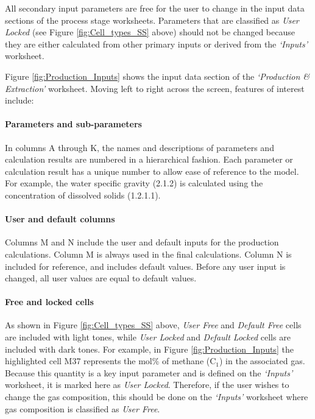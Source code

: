 \documentclass[11pt]{report}
\newcommand{\sheet}[1]{\textit{`{#1}'}}
\begin{document}
All secondary input parameters are free for the user to change in the input data sections of the process stage worksheets. Parameters that are classified as \emph{User Locked} (see Figure \ref{fig:Cell_types_SS} above) should not be changed because they are either calculated from other primary inputs or derived from the \sheet{Inputs} worksheet.

Figure \ref{fig:Production_Inputs} shows the input data section of the \sheet{Production \& Extraction} worksheet. Moving left to right across the screen, features of interest include:

\paragraph{Parameters and sub-parameters} In columns A through K, the names and descriptions of parameters and calculation results are numbered in a hierarchical fashion. Each parameter or calculation result has a unique number to allow ease of reference to the model. For example, the water specific gravity (2.1.2) is calculated using the concentration of dissolved solids (1.2.1.1).

\paragraph{User and default columns} Columns M and N include the user and default inputs for the production calculations. Column M is always used in the final calculations. Column N is included for reference, and includes default values. Before any user input is changed, all user values are equal to default values.

\paragraph{Free and locked cells} As shown in Figure \ref{fig:Cell_types_SS} above, \emph{User Free} and \emph{Default Free} cells are included with light tones, while \emph{User Locked} and \emph{Default Locked} cells are included with dark tones. For example, in Figure \ref{fig:Production_Inputs} the highlighted cell M37 represents the mol\% of methane (C$_1$) in the associated gas. Because this quantity is a key input parameter and is defined on the \sheet{Inputs} worksheet, it is marked here as \emph{User Locked}. Therefore, if the user wishes to change the gas composition, this should be done on the \sheet{Inputs} worksheet where gas composition is classified as \emph{User Free}.
\end{document}

